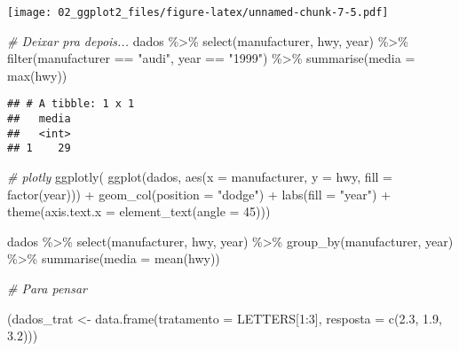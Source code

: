 \documentclass[
]{book}
\newenvironment{Shaded}{\begin{snugshade}}{\end{snugshade}}
\newcommand{\AttributeTok}[1]{\textcolor[rgb]{0.77,0.63,0.00}{#1}}
\newcommand{\CommentTok}[1]{\textcolor[rgb]{0.56,0.35,0.01}{\textit{#1}}}
\newcommand{\DecValTok}[1]{\textcolor[rgb]{0.00,0.00,0.81}{#1}}
\newcommand{\FloatTok}[1]{\textcolor[rgb]{0.00,0.00,0.81}{#1}}
\newcommand{\FunctionTok}[1]{\textcolor[rgb]{0.00,0.00,0.00}{#1}}
\newcommand{\NormalTok}[1]{#1}
\newcommand{\OtherTok}[1]{\textcolor[rgb]{0.56,0.35,0.01}{#1}}
\newcommand{\SpecialCharTok}[1]{\textcolor[rgb]{0.00,0.00,0.00}{#1}}
\newcommand{\StringTok}[1]{\textcolor[rgb]{0.31,0.60,0.02}{#1}}
\begin{document}
\texttt{[image: 02\_ggplot2\_files/figure-latex/unnamed-chunk-7-5.pdf]}

\begin{Shaded}
\begin{Highlighting}[]
\CommentTok{\# Deixar pra depois...}
\NormalTok{ dados }\SpecialCharTok{\%\textgreater{}\%} 
    \FunctionTok{select}\NormalTok{(manufacturer, hwy, year) }\SpecialCharTok{\%\textgreater{}\%} 
    \FunctionTok{filter}\NormalTok{(manufacturer }\SpecialCharTok{==} \StringTok{"audi"}\NormalTok{, year }\SpecialCharTok{==} \StringTok{"1999"}\NormalTok{) }\SpecialCharTok{\%\textgreater{}\%} 
    \FunctionTok{summarise}\NormalTok{(}\AttributeTok{media =} \FunctionTok{max}\NormalTok{(hwy))}
\end{Highlighting}
\end{Shaded}

\begin{verbatim}
## # A tibble: 1 x 1
##   media
##   <int>
## 1    29
\end{verbatim}

\begin{Shaded}
\begin{Highlighting}[]
\CommentTok{\# plotly}
\FunctionTok{ggplotly}\NormalTok{(}
\FunctionTok{ggplot}\NormalTok{(dados, }\FunctionTok{aes}\NormalTok{(}\AttributeTok{x =}\NormalTok{ manufacturer, }\AttributeTok{y =}\NormalTok{ hwy, }\AttributeTok{fill =} \FunctionTok{factor}\NormalTok{(year))) }\SpecialCharTok{+} 
  \FunctionTok{geom\_col}\NormalTok{(}\AttributeTok{position =} \StringTok{"dodge"}\NormalTok{) }\SpecialCharTok{+} 
  \FunctionTok{labs}\NormalTok{(}\AttributeTok{fill =} \StringTok{"year"}\NormalTok{) }\SpecialCharTok{+}
  \FunctionTok{theme}\NormalTok{(}\AttributeTok{axis.text.x =} \FunctionTok{element\_text}\NormalTok{(}\AttributeTok{angle =} \DecValTok{45}\NormalTok{)))}

\NormalTok{dados }\SpecialCharTok{\%\textgreater{}\%} \FunctionTok{select}\NormalTok{(manufacturer, hwy, year) }\SpecialCharTok{\%\textgreater{}\%} 
  \FunctionTok{group\_by}\NormalTok{(manufacturer, year) }\SpecialCharTok{\%\textgreater{}\%} 
  \FunctionTok{summarise}\NormalTok{(}\AttributeTok{media =} \FunctionTok{mean}\NormalTok{(hwy))}
\end{Highlighting}
\end{Shaded}

\begin{Shaded}
\begin{Highlighting}[]
\CommentTok{\# Para pensar}

\NormalTok{(dados\_trat }\OtherTok{\textless{}{-}} \FunctionTok{data.frame}\NormalTok{(}\AttributeTok{tratamento =}\NormalTok{ LETTERS[}\DecValTok{1}\SpecialCharTok{:}\DecValTok{3}\NormalTok{], }
                         \AttributeTok{resposta =} \FunctionTok{c}\NormalTok{(}\FloatTok{2.3}\NormalTok{, }\FloatTok{1.9}\NormalTok{, }\FloatTok{3.2}\NormalTok{)))}
\end{Highlighting}
\end{Shaded}
\end{document}
